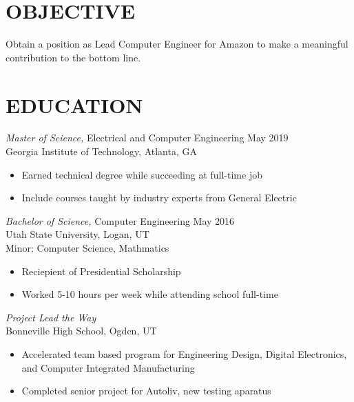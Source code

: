 \documentclass[line,margin]{res}
\begin{document}
\address{sam.tanner@aggiemail.usu.edu}
\address{(208) 830-1983}


\begin{resume}

	\section{OBJECTIVE}
	Obtain a position as Lead Computer Engineer for Amazon to make a meaningful contribution
	to the bottom line.


	\section{EDUCATION}
	 {\sl Master of Science,} Electrical and Computer Engineering \hfill May 2019\\
	Georgia Institute of Technology, Atlanta, GA
	\begin{itemize} \itemsep -2pt %
		\item Earned technical degree while succeeding at full-time job
		\item Include courses taught by industry experts from General Electric
	\end{itemize}


	{\sl Bachelor of Science,} Computer Engineering \hfill May 2016\\
	Utah State University, Logan, UT\\
	Minor: Computer Science, Mathmatics
	\begin{itemize} \itemsep -2pt %
		\item Reciepient of Presidential Scholarship
		\item Worked 5-10 hours per week while attending school full-time
	\end{itemize}

	{\sl Project Lead the Way}\\
	Bonneville High School, Ogden, UT
	\begin{itemize} \itemsep -2pt
		\item Accelerated team based program for Engineering Design, Digital Electronics,
		      and Computer Integrated Manufacturing
		\item Completed senior project for Autoliv, new testing aparatus
	\end{itemize}


\end{resume}
\end{document}

